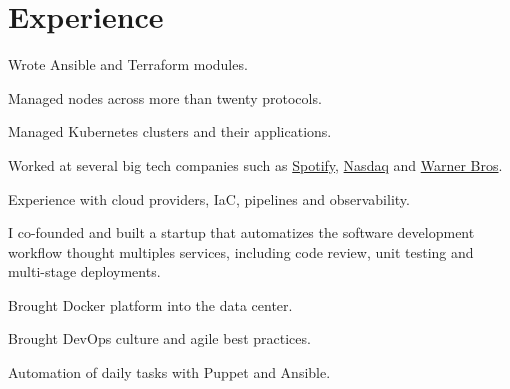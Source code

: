 \documentclass[]{willianpaixao-resume}
\begin{document}
\hfill
\begin{minipage}[t]{0.64\textwidth}

\section{Experience}
\sectionsep
\begin{tightemize}
\item Wrote Ansible and Terraform modules.
\item Managed nodes across more than twenty protocols.
\item Managed Kubernetes clusters and their applications.
\end{tightemize}
\sectionsep

\begin{tightemize}
\item Worked at several big tech companies such as \href{https://www.spotify.com/}{Spotify}, \href{https://www.nasdaq.com/}{Nasdaq} and \href{https://www.warnerbros.com/}{Warner Bros}.
\item Experience with cloud providers, IaC, pipelines and observability.
\end{tightemize}
\sectionsep


\sectionsep
I co-founded and built a startup that automatizes the software development
workflow thought multiples services, including code review, unit testing and
multi-stage deployments.
\sectionsep
\begin{tightemize}
\item Brought Docker platform into the data center.
\item Brought DevOps culture and agile best practices.
\item Automation of daily tasks with Puppet and Ansible.
\end{tightemize}
\sectionsep


\end{minipage}
\end{document}
